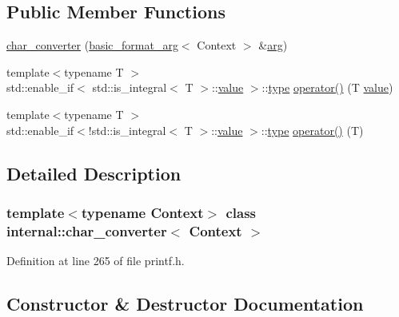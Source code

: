 \subsection*{Public Member Functions}
\begin{DoxyCompactItemize}
\item 
\hyperlink{classinternal_1_1char__converter_acbd06428c2b41509849b0eb41588f4c5}{char\+\_\+converter} (\hyperlink{classbasic__format__arg}{basic\+\_\+format\+\_\+arg}$<$ Context $>$ \&\hyperlink{core_8h_ab87859023d64d26171b1e74a3d0c3b99}{arg})
\item 
{\footnotesize template$<$typename T $>$ }\\std\+::enable\+\_\+if$<$ std\+::is\+\_\+integral$<$ T $>$\+::\hyperlink{classinternal_1_1value}{value} $>$\+::\hyperlink{namespaceinternal_a8661864098ac0acff9a6dd7e66f59038}{type} \hyperlink{classinternal_1_1char__converter_acb6161f2bed5a8f57727794f62922004}{operator()} (T \hyperlink{classinternal_1_1value}{value})
\item 
{\footnotesize template$<$typename T $>$ }\\std\+::enable\+\_\+if$<$!std\+::is\+\_\+integral$<$ T $>$\+::\hyperlink{classinternal_1_1value}{value} $>$\+::\hyperlink{namespaceinternal_a8661864098ac0acff9a6dd7e66f59038}{type} \hyperlink{classinternal_1_1char__converter_a7ae1a2c3d88d71ef1618d34d5a47a184}{operator()} (T)
\end{DoxyCompactItemize}


\subsection{Detailed Description}
\subsubsection*{template$<$typename Context$>$\newline
class internal\+::char\+\_\+converter$<$ Context $>$}



Definition at line 265 of file printf.\+h.



\subsection{Constructor \& Destructor Documentation}
\mbox{\label{classinternal_1_1char__converter_acbd06428c2b41509849b0eb41588f4c5}} 
